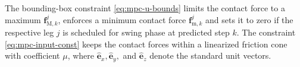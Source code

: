 The bounding-box constraint \eqref{eq:mpc-u-bounds} limits the contact force to a maximum $\mathbf{f}_{\mathrm{M},k}^j$, enforces a minimum contact force $\mathbf{f}_{\mathrm{m},k}^j$ and sets it to zero if the respective leg $j$ is scheduled for swing phase at predicted step $k$.
The constraint \eqref{eq:mpc-input-const} keeps the contact forces within a linearized friction cone with coefficient $\mu$, where $\hat{\mathbf{e}}_x, \hat{\mathbf{e}}_y,$ and $\hat{\mathbf{e}}_z$ denote the standard unit vectors.
